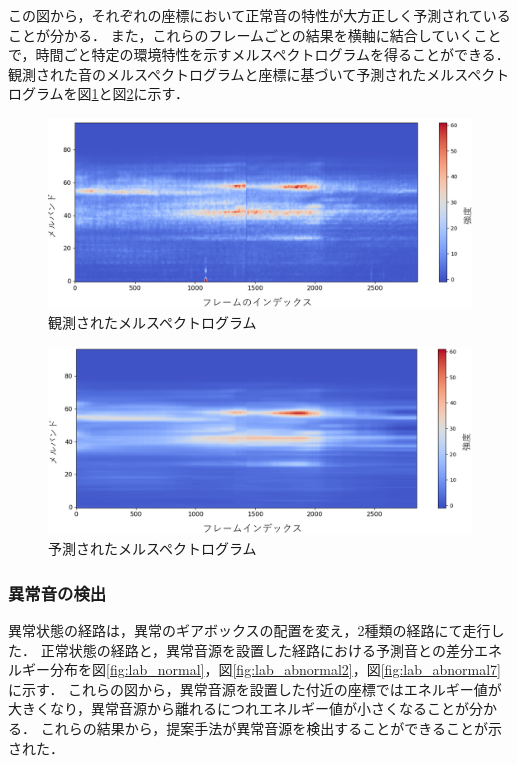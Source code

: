 \documentclass[../main]{subfiles}
\begin{document}
この図から，それぞれの座標において正常音の特性が大方正しく予測されていることが分かる．
また，これらのフレームごとの結果を横軸に結合していくことで，時間ごと特定の環境特性を示すメルスペクトログラムを得ることができる．
観測された音のメルスペクトログラムと座標に基づいて予測されたメルスペクトログラムを図\ref{fig:observed_mel}と図\ref{fig:predicted_mel}に示す．

\begin{figure}[t]
  \centering
  \includegraphics[keepaspectratio, width=0.7\linewidth]{chap4/observed_mel.png}
  \caption{観測されたメルスペクトログラム}
  \label{fig:observed_mel}
\end{figure}

\begin{figure}[t]
  \centering
  \includegraphics[keepaspectratio, width=0.7\linewidth]{chap4/predicted_mel.png}
  \caption{予測されたメルスペクトログラム}
  \label{fig:predicted_mel}
\end{figure}


\subsubsection{異常音の検出} \label{subsubsec:anomaly_detection}
異常状態の経路は，異常のギアボックスの配置を変え，2種類の経路にて走行した．
正常状態の経路と，異常音源を設置した経路における予測音との差分エネルギー分布を図\ref{fig:lab_normal}，図\ref{fig:lab_abnormal2}，図\ref{fig:lab_abnormal7}に示す．
これらの図から，異常音源を設置した付近の座標ではエネルギー値が大きくなり，異常音源から離れるにつれエネルギー値が小さくなることが分かる．
これらの結果から，提案手法が異常音源を検出することができることが示された．
\end{document}
